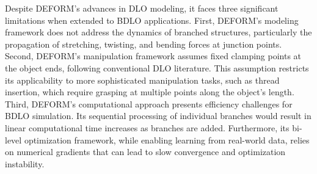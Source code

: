 Despite DEFORM's advances in DLO modeling, it faces three significant limitations when extended to BDLO applications. First, DEFORM's modeling framework does not address the dynamics of branched structures, particularly the propagation of stretching, twisting, and bending forces at junction points. 
Second, DEFORM's manipulation framework assumes fixed clamping points at the object ends, following conventional DLO literature. 
This assumption restricts its applicability to more sophisticated manipulation tasks, such as thread insertion, which require grasping at multiple points along the object's length.
Third, DEFORM's computational approach presents efficiency challenges for BDLO simulation.
Its sequential processing of individual branches would result in linear computational time increases as branches are added. 
Furthermore, its bi-level optimization framework, while enabling learning from real-world data, relies on numerical gradients that can lead to slow convergence and optimization instability.



